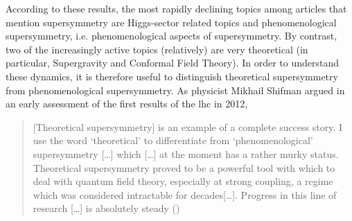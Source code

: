 \documentclass[smallextended]{svjour3}
\begin{document}
According to these results, the most rapidly declining topics among articles that mention supersymmetry are Higgs-sector related topics and phenomenological supersymmetry, i.e. phenomenological aspects of supersymmetry. By contrast, two of the increasingly active topics (relatively) are very theoretical (in particular, Supergravity and Conformal Field Theory). %
In order to understand these dynamics, it is therefore useful to distinguish theoretical supersymmetry from phenomenological supersymmetry. As physicist Mikhail Shifman argued in an early assessment of the first results of the \gls{lhc} in 2012, 

\begin{quote}
    [Theoretical supersymmetry] is an example of a complete success story. I use the word ‘theoretical’ to differentiate from ‘phenomenological’ supersymmetry [\dots] which [\dots] at the moment has a rather murky status. Theoretical supersymmetry proved to be a powerful tool with which to deal with quantum field theory, especially at strong coupling, a regime which was considered intractable for decades[\dots]. Progress in this line of research [\dots] is absolutely steady (\citealt[p.~6]{SHIFMAN2012})
\end{quote}


\end{document}
